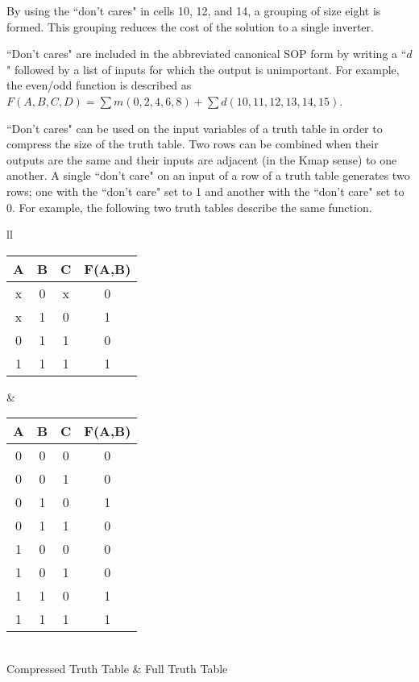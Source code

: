 \begin{changemargin}{1.5cm}{1.5cm}

By using the ``don't cares" in cells 10, 12, and 14, a grouping of
size eight is formed.  This grouping reduces the cost of the solution
to a single inverter.


``Don't cares" are included in the abbreviated canonical SOP form by 
writing a ``$d$" followed by a list of inputs for which the output is
unimportant.  For example, the even/odd function is described 
as $F(A,B,C,D) = \sum m(0,2,4,6,8) + \sum d(10,11,12,13,14,15)$.
\end{changemargin}

``Don't cares" can be used on the input variables of a truth table 
in order to compress the size of the truth table.  Two rows can
be combined when their outputs are the same and their inputs are
adjacent (in the Kmap sense) to one another.  A single ``don't care"
on an input of a row of a truth table generates two rows; one 
with the ``don't care" set to 1 and another with the ``don't care"
set to 0.  For example, the following two truth tables describe 
the same function.

\begin{tabular}{ll}
\begin{tabular}{c|c|c||c}
A & B & C & F(A,B) \\ \hline
x & 0 & x & 0 \\ \hline
x & 1 & 0 & 1 \\ \hline
0 & 1 & 1 & 0 \\ \hline
1 & 1 & 1 & 1 \\ 
\end{tabular} 

&

\begin{tabular}{c|c|c||c}
A & B & C & F(A,B) \\ \hline
0 & 0 & 0 & 0 \\ \hline
0 & 0 & 1 & 0 \\ \hline
0 & 1 & 0 & 1 \\ \hline
0 & 1 & 1 & 0 \\ \hline
1 & 0 & 0 & 0 \\ \hline
1 & 0 & 1 & 0 \\ \hline
1 & 1 & 0 & 1 \\ \hline
1 & 1 & 1 & 1 \\ 

\end{tabular}  \\
Compressed Truth Table & Full Truth Table \\
\end{tabular}

